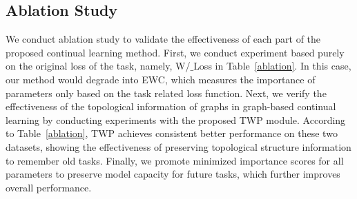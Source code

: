 \documentclass[letterpaper]{article} %
\begin{document}

\subsection{Ablation Study}
We conduct ablation study to validate the effectiveness of
each part of the proposed continual learning method.
First, we conduct experiment based purely on the original loss
of the task,
namely, W/$\_$Loss in Table~\ref{ablation}.
In this case, our method would degrade into EWC, which measures the importance of parameters only based on the task related loss function.
Next, we verify the effectiveness of the topological information
of graphs in graph-based continual learning
by conducting experiments with the proposed TWP module.
According to Table~\ref{ablation}, TWP achieves consistent better
performance on these two datasets, showing the effectiveness of preserving topological structure information to remember old tasks.
Finally, we promote minimized importance scores for all parameters to preserve model capacity for future tasks,
which further improves overall performance.
\end{document}
